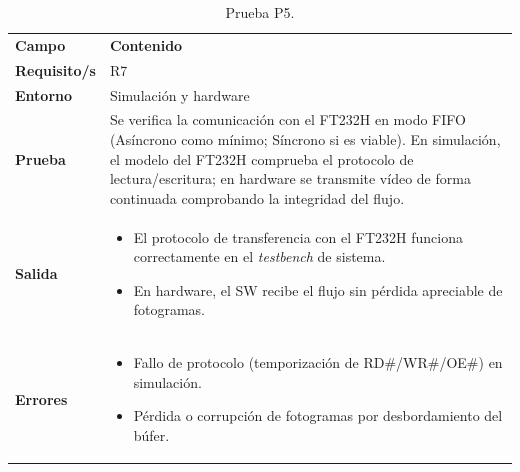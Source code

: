 \documentclass[../main.tex]{subfiles}
\begin{document}
\begin{table}[H]
\centering
\caption{Prueba P5.}
\label{tab:prueba_p5}
\begin{tabular}{>{\raggedright\arraybackslash}p{2.5cm}>{\raggedright\arraybackslash}p{11cm}}
\rowcolor[HTML]{156082}
{\color{white}\textbf{Campo}} & {\color{white}\textbf{Contenido}} \\
\rowcolor[HTML]{C0E6F5}
\textbf{Requisito/s} & R7 \\
\textbf{Entorno} & Simulación y hardware \\
\rowcolor[HTML]{C0E6F5}
\textbf{Prueba} & Se verifica la comunicación con el FT232H en modo FIFO (Asíncrono como mínimo; Síncrono si es viable). En simulación, el modelo del FT232H comprueba el protocolo de lectura/escritura; en hardware se transmite vídeo de forma continuada comprobando la integridad del flujo. \\
\textbf{Salida} & \begin{itemize}\setlength{\itemsep}{0pt}
    \item El protocolo de transferencia con el FT232H funciona correctamente en el \emph{testbench} de sistema.
    \item En hardware, el \ac{SW} recibe el flujo sin pérdida apreciable de fotogramas.
\end{itemize} \\
\rowcolor[HTML]{C0E6F5}
\textbf{Errores} & \begin{itemize}\setlength{\itemsep}{0pt}
    \item Fallo de protocolo (temporización de RD\#/WR\#/OE\#) en simulación.
    \item Pérdida o corrupción de fotogramas por desbordamiento del búfer.
\end{itemize} \\
\end{tabular}
\end{table}
\end{document}
